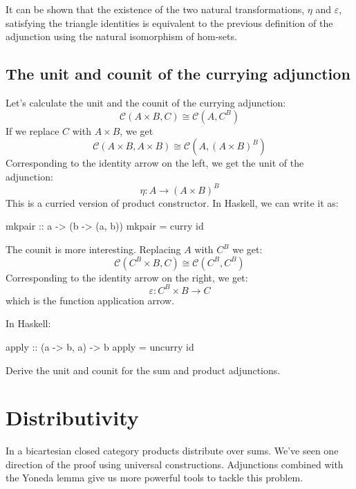 \documentclass[DaoFP]{subfiles}
\begin{document}
It can be shown that the existence of the two natural transformations, $\eta$ and $\varepsilon$, satisfying the triangle identities is equivalent to the previous definition of the adjunction using the natural isomorphism of hom-sets.

\subsection{The unit and counit of the currying adjunction}

Let's calculate the unit and the counit of the currying adjunction:
\[  \mathcal{C}(A \times B, C ) \cong  \mathcal{C} (A, C^B)  \]
If we replace $C$ with $A \times B$, we get
\[  \mathcal{C}(A \times B, A \times B ) \cong  \mathcal{C} (A, (A \times B)^B)  \]
Corresponding to the identity arrow on the left, we get the unit of the adjunction:
\[ \eta \colon A \to (A \times B)^B \]
This is a curried version of product constructor. In Haskell, we can write it as:
\begin{haskell}
mkpair :: a -> (b -> (a, b))
mkpair = curry id
\end{haskell}

The counit is more interesting. Replacing $A$ with $C^B$ we get:
\[  \mathcal{C}(C^B \times B, C ) \cong  \mathcal{C} (C^B, C^B)  \]
Corresponding to the identity arrow on the right, we get:
\[ \varepsilon \colon C^B \times B \to C \]
which is the function application arrow. 

In Haskell:
\begin{haskell}
apply :: (a -> b, a) -> b
apply = uncurry id
\end{haskell}

\begin{exercise}
Derive the unit and counit for the sum and product adjunctions.
\end{exercise}

\section{Distributivity}

In a bicartesian closed category products distribute over sums. We've seen one direction of the proof using universal constructions. Adjunctions combined with the Yoneda lemma give us more powerful tools to tackle this problem.
\end{document}

